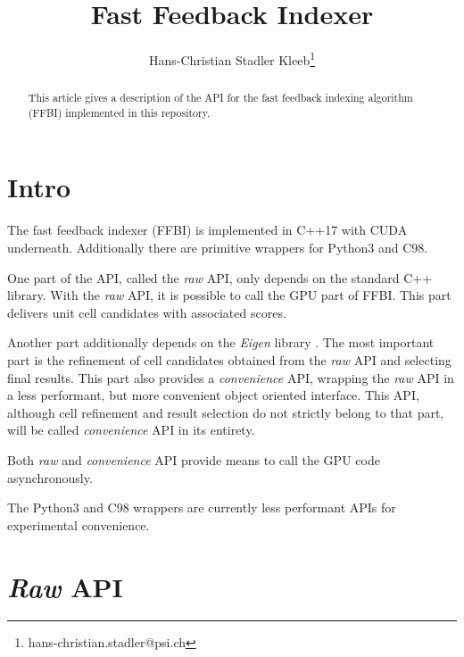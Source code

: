 \documentclass[a4paper,10pt]{article}
\title{Fast Feedback Indexer}
\author{Hans-Christian Stadler Kleeb\thanks{hans-christian.stadler@psi.ch}}
\begin{document}
\maketitle

\begin{abstract}
This article gives a description of the API for the fast feedback indexing algorithm (FFBI) implemented in this repository.
\end{abstract}

\section{Intro}\label{sec:intro}

The fast feedback indexer (FFBI) is implemented in C++17 with CUDA \cite{cuda} underneath. Additionally there are primitive wrappers for Python3 and C98.

One part of the API, called the \emph{raw} API, only depends on the standard C++ library. With the \emph{raw} API, it is possible to call the GPU part of FFBI. This part delivers unit cell candidates with associated scores.

Another part additionally depends on the \emph{Eigen} library \cite{eigenweb}. The most important part is the refinement of cell candidates obtained from the \emph{raw} API and selecting final results. This part also provides a \emph{convenience} API, wrapping the \emph{raw} API in a less performant, but more convenient object oriented interface. This API, although cell refinement and result selection do not strictly belong to that part, will be called \emph{convenience} API in its entirety.

Both \emph{raw} and \emph{convenience} API provide means to call the GPU code asynchronously.

The Python3 and C98 wrappers are currently less performant APIs for experimental convenience.

\section{\emph{Raw} API}
\lstset{language=C++}
\end{document}
